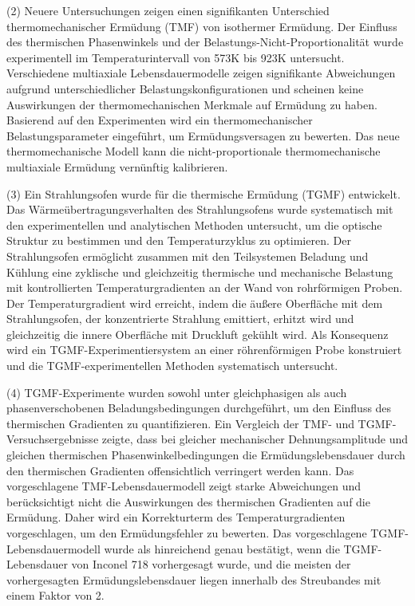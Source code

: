 (2) Neuere Untersuchungen zeigen einen signifikanten Unterschied thermomechanischer Ermüdung (TMF) von isothermer Ermüdung. Der Einfluss des thermischen Phasenwinkels und der Belastungs-Nicht-Proportionalität wurde experimentell im Temperaturintervall von 573K bis 923K untersucht. Verschiedene multiaxiale Lebensdauermodelle zeigen signifikante Abweichungen aufgrund unterschiedlicher Belastungskonfigurationen und scheinen keine Auswirkungen der thermomechanischen Merkmale auf Ermüdung zu haben. Basierend auf den Experimenten wird ein thermomechanischer Belastungsparameter eingeführt, um Ermüdungsversagen zu bewerten. Das neue thermomechanische Modell kann die nicht-proportionale thermomechanische multiaxiale Ermüdung vernünftig kalibrieren.

(3) Ein Strahlungsofen wurde für die thermische Ermüdung (TGMF) entwickelt. Das Wärmeübertragungsverhalten des Strahlungsofens wurde systematisch mit den experimentellen und analytischen Methoden untersucht, um die optische Struktur zu bestimmen und den Temperaturzyklus zu optimieren. Der Strahlungsofen ermöglicht zusammen mit den Teilsystemen Beladung und Kühlung eine zyklische und gleichzeitig thermische und mechanische Belastung mit kontrollierten Temperaturgradienten an der Wand von rohrförmigen Proben. Der Temperaturgradient wird erreicht, indem die äußere Oberfläche mit dem Strahlungsofen, der konzentrierte Strahlung emittiert, erhitzt wird und gleichzeitig die innere Oberfläche mit Druckluft gekühlt wird. Als Konsequenz wird ein TGMF-Experimentiersystem an einer röhrenförmigen Probe konstruiert und die TGMF-experimentellen Methoden systematisch untersucht.

(4) TGMF-Experimente wurden sowohl unter gleichphasigen als auch phasenverschobenen Beladungsbedingungen durchgeführt, um den Einfluss des thermischen Gradienten zu quantifizieren. Ein Vergleich der TMF- und TGMF-Versuchsergebnisse zeigte, dass bei gleicher mechanischer Dehnungsamplitude und gleichen thermischen Phasenwinkelbedingungen die Ermüdungslebensdauer durch den thermischen Gradienten offensichtlich verringert werden kann. Das vorgeschlagene TMF-Lebensdauermodell zeigt starke Abweichungen und berücksichtigt nicht die Auswirkungen des thermischen Gradienten auf die Ermüdung. Daher wird ein Korrekturterm des Temperaturgradienten vorgeschlagen, um den Ermüdungsfehler zu bewerten. Das vorgeschlagene TGMF-Lebensdauermodell wurde als hinreichend genau bestätigt, wenn die TGMF-Lebensdauer von Inconel 718 vorhergesagt wurde, und die meisten der vorhergesagten Ermüdungslebensdauer liegen innerhalb des Streubandes mit einem Faktor von 2.